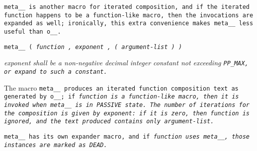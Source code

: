 \tt{meta__} is another macro for iterated composition, and if the iterated function
happens to be a function-like macro, then the invocations are expanded as well;
ironically, this extra convenience makes \tt{meta__} less useful than \tt{o__}.


\tt{meta__ (} \it{function} \tt{,} \it{exponent} \tt{, (} \it{argument-list} \tt{) )}


\it{exponent} shall be a non-negative decimal integer constant
not exceeding \tt{PP_MAX}, or expand to such a constant.


The macro \tt{meta__} produces an iterated function composition text
as generated by \tt{o__}; if \it{function} is a function-like macro,
then it is invoked when \tt{meta__} is in \it{\tt{PASSIVE}} state.
The number of iterations for the composition is given by \it{exponent}:
if it is zero, then \it{function} is ignored,
and the text produced contains only \it{argument-list}.

\note \tt{meta__} has its own expander macro, and if \it{function}
 uses \tt{meta__}, those instances are marked as \it{\tt{DEAD}}.
